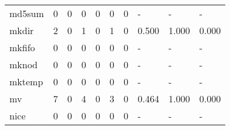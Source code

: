 \begin{longtable}{lp{1.3cm}p{1.3cm}p{1.3cm}p{1.3cm}p{1.3cm}p{1.3cm}p{1.3cm}p{1.3cm}p{1.3cm}}
md5sum    &                      0 &                                  0 &                                 0 &                                0 &                                 0 &                               0 &                                    - &                                      - &                                    - \\
mkdir     &                      2 &                                  0 &                                 1 &                                0 &                                 1 &                               0 &                                0.500 &                                  1.000 &                                0.000 \\
mkfifo    &                      0 &                                  0 &                                 0 &                                0 &                                 0 &                               0 &                                    - &                                      - &                                    - \\
mknod     &                      0 &                                  0 &                                 0 &                                0 &                                 0 &                               0 &                                    - &                                      - &                                    - \\
mktemp    &                      0 &                                  0 &                                 0 &                                0 &                                 0 &                               0 &                                    - &                                      - &                                    - \\
mv        &                      7 &                                  0 &                                 4 &                                0 &                                 3 &                               0 &                                0.464 &                                  1.000 &                                0.000 \\
nice      &                      0 &                                  0 &                                 0 &                                0 &                                 0 &                               0 &                                    - &                                      - &                                    - \\

\end{longtable}
